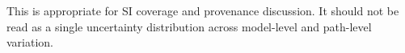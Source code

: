 This is appropriate for SI coverage and provenance discussion. It should not be read as a single uncertainty distribution across model-level and path-level variation.

